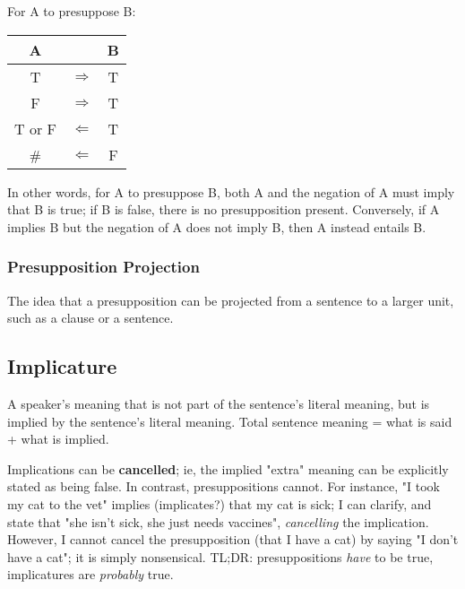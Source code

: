 \documentclass[12pt]{article}
\begin{document}
For A to presuppose B:
\begin{center}
  \begin{tabular}{| c | c | c |}
    \hline
    A & & B\\
    \hline
    T & $\Rightarrow$ & T\\
    F & $\Rightarrow$ & T\\
    T or F & $\Leftarrow$ & T\\
    \# & $\Leftarrow$ & F\\
    \hline
  \end{tabular}
\end{center}

In other words, for A to presuppose B, both A and the negation of A must imply that B is true; if B is false, there is no presupposition present. Conversely, if A implies B but the negation of A does not imply B, then A instead entails B.


\subsubsection{Presupposition Projection}
\begin{definitionEnd}
  The idea that a presupposition can be projected from a sentence to a larger unit, such as a clause or a sentence.
\end{definitionEnd}

\subsection{Implicature}

\begin{definitionEnd}[Implicature]
A speaker's meaning that is not part of the sentence's literal meaning, but is implied by the sentence's literal meaning. Total sentence meaning = what is said + what is implied.
\end{definitionEnd}


Implications can be \textbf{cancelled}; ie, the implied "extra" meaning can be explicitly stated as being false. In contrast, presuppositions cannot. For instance, "I took my cat to the vet" implies (implicates?) that my cat is sick; I can clarify, and state that "she isn't sick, she just needs vaccines", \textit{cancelling} the implication. However, I cannot cancel the presupposition (that I have a cat) by saying "I don't have a cat"; it is simply nonsensical. TL;DR: presuppositions \textit{have} to be true, implicatures are \textit{probably} true.
\end{document}
